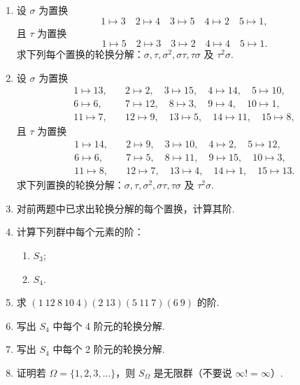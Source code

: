 \begin{enumerate}
\item 设 \( \sigma \) 为置换
\[
1 \mapsto 3 \quad 2 \mapsto 4 \quad 3 \mapsto 5 \quad 4 \mapsto 2 \quad 5 \mapsto 1,
\]
且 \( \tau \) 为置换
\[
1 \mapsto 5 \quad 2 \mapsto 3 \quad 3 \mapsto 2 \quad 4 \mapsto 4 \quad 5 \mapsto 1.
\]
求下列每个置换的轮换分解：\( \sigma, \tau, \sigma^2, \sigma\tau, \tau\sigma \) 及 \( \tau^2\sigma \).

\item 设 \( \sigma \) 为置换
\[
\begin{aligned}
1 \mapsto 13,&\quad 2 \mapsto 2,\quad 3 \mapsto 15,\quad 4 \mapsto 14,\quad 5 \mapsto 10,\\
6 \mapsto 6,&\quad 7 \mapsto 12,\quad 8 \mapsto 3,\quad 9 \mapsto 4,\quad 10 \mapsto 1,\\
11 \mapsto 7,&\quad 12 \mapsto 9,\quad 13 \mapsto 5,\quad 14 \mapsto 11,\quad 15 \mapsto 8,
\end{aligned}
\]
且 \( \tau \) 为置换
\[
\begin{aligned}
1 \mapsto 14,&\quad 2 \mapsto 9,\quad 3 \mapsto 10,\quad 4 \mapsto 2,\quad 5 \mapsto 12,\\
6 \mapsto 6,&\quad 7 \mapsto 5,\quad 8 \mapsto 11,\quad 9 \mapsto 15,\quad 10 \mapsto 3,\\
11 \mapsto 8,&\quad 12 \mapsto 7,\quad 13 \mapsto 4,\quad 14 \mapsto 1,\quad 15 \mapsto 13.
\end{aligned}
\]
求下列置换的轮换分解：\( \sigma, \tau, \sigma^2, \sigma\tau, \tau\sigma \) 及 \( \tau^2\sigma \).

\item 对前两题中已求出轮换分解的每个置换，计算其阶.

\item 计算下列群中每个元素的阶：
\begin{enumerate}[label=(\alph*)]
\item \( S_3 \);
\item \( S_4 \).
\end{enumerate}

\item 求 \( (1 \ 12 \ 8 \ 10 \ 4)(2 \ 13)(5 \ 11 \ 7)(6 \ 9) \) 的阶.

\item 写出 \( S_4 \) 中每个 4 阶元的轮换分解.

\item 写出 \( S_4 \) 中每个 2 阶元的轮换分解.

\item 证明若 \( \Omega = \{1, 2, 3, \dots\} \)，则 \( S_\Omega \) 是无限群（不要说 \( \infty! = \infty \)）.


\end{enumerate}
